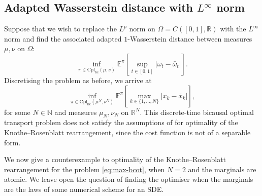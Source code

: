 \documentclass[oneside]{amsart}
\theoremstyle{definition}
\newcommand{\N}{\mathbb N}
\newcommand{\R}{\mathbb R}
\newcommand{\cpl}{\mathrm{Cpl}}
\newcommand{\cplba}{\cpl_{\mathrm{bc}}}
\def\E{{\mathbb E}}
\def\R{{\mathbb R}}
\numberwithin{equation}{section}
\begin{document}
	\subsection{Adapted Wasserstein distance with $L^\infty$ norm}
		Suppose that we wish to replace the $L^p$ norm on $\Omega = C([0, 1], \R)$ with the $L^\infty$ norm and find the associated adapted $1$-Wasserstein distance between measures $\mu, \nu$ on $\Omega$:
		\begin{equation}\label{eq:sup-bcot}
			\inf_{\pi \in \cplba(\mu, \nu)}\E^\pi\!\left[\sup_{t \in [0, 1]}|\omega_t - \bar \omega_t|\right].
		\end{equation}
		Discretising the problem as before, we arrive at
		\begin{equation}\label{eq:max-bcot}
			\inf_{\pi \in \cplba(\mu^N, \nu^N)}\E^\pi\!\left[\max_{k \in \{1, \dotsc, N\}}|x_k - \bar x_k|\right],
		\end{equation}
		for some $N \in \N$ and measures $\mu_N, \nu_N$ on $\R^N$. This discrete-time bicausal optimal transport problem does not satisfy the assumptions of  for optimality of the Knothe--Rosenblatt rearrangement, since the cost function is not of a separable form.
		
		We now give a counterexample to optimality of the Knothe--Rosenblatt rearrangement for the problem \eqref{eq:max-bcot}, when $N = 2$ and the marginals are atomic. We leave open the question of finding the optimiser when the marginals are the laws of some numerical scheme for an SDE.
		
\end{document}
